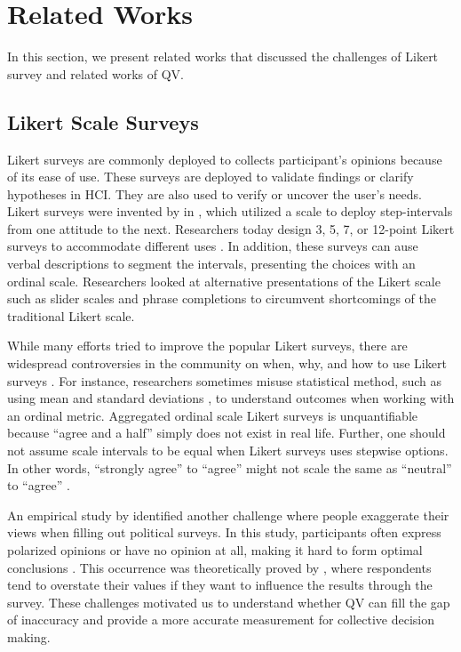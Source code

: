 \section{Related Works} \label{related_works}
In this section, 
we present related works
that discussed the challenges
of Likert survey
and related works of QV.

\subsection{Likert Scale Surveys}
Likert surveys are commonly deployed
to collects participant's opinions
because of its ease of use.
These surveys are deployed
to validate findings or clarify hypotheses
\cite{ozok2009survey, ledo2018evaluation} in HCI.
They are also used to verify or uncover the user's needs.
Likert surveys were invented by \textcite{likert1932technique} 
in \citeyear{likert1932technique},
which utilized a scale to deploy step-intervals 
from one attitude to the next.
Researchers today design 3, 5, 7, 
or 12-point Likert surveys to accommodate different uses
\cite{garland2008computer,finstad2010}.
In addition, these surveys
can ause verbal descriptions
to segment the intervals,
presenting the choices with an ordinal scale.
Researchers looked at
alternative presentations of the Likert scale
such as slider scales \cite{roster2015exploring} 
and phrase completions \cite{hodge2003phrase}
to circumvent shortcomings of the traditional Likert scale.

While many efforts tried to
improve the popular Likert surveys,
there are widespread controversies in the community on
when, why, and how to use Likert surveys \cite{bishop2015use}.
For instance, 
researchers sometimes misuse statistical method,
such as using mean and standard deviations \cite{jamieson2004likert},
to understand outcomes
when working with an ordinal metric.
Aggregated ordinal scale Likert surveys is 
unquantifiable because ``agree and a half'' 
simply does not exist in real life.
Further, 
one should not assume scale intervals to be equal
when Likert surveys uses stepwise options.
In other words,
``strongly agree'' to ``agree''
might not scale the same as 
``neutral'' to ``agree'' 
\cite{jamieson2004likert, edmondson2005likert}.

An empirical study by \textcite{quarfoot2017quadratic}
identified another challenge
where people exaggerate their views
when filling out political surveys.
In this study,
participants often express polarized opinions
or have no opinion at all,
making it hard to form optimal conclusions \cite{posner2018radical}.
This occurrence was 
theoretically proved by \textcite{cavaille2018towards},
where respondents tend to overstate their values
if they want to influence the results through the survey.
These challenges motivated us 
to understand whether QV can fill the gap of inaccuracy
and provide a more accurate measurement
for collective decision making.\par

